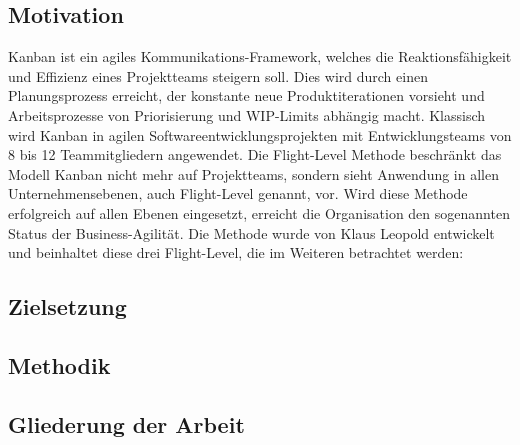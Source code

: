 \subsection{Motivation}
Kanban ist ein agiles Kommunikations-Framework, welches die Reaktionsfähigkeit und Effizienz eines Projektteams steigern soll. Dies wird durch einen Planungsprozess erreicht, der konstante neue Produktiterationen vorsieht und Arbeitsprozesse von Priorisierung und WIP-Limits abhängig macht.
Klassisch wird Kanban in agilen Softwareentwicklungsprojekten mit Entwicklungsteams von 8 bis 12 Teammitgliedern angewendet.
Die Flight-Level Methode beschränkt das Modell Kanban nicht mehr auf Projektteams, sondern sieht Anwendung in allen Unternehmensebenen, auch Flight-Level genannt, vor. Wird diese Methode erfolgreich auf allen Ebenen eingesetzt, erreicht die Organisation den sogenannten Status der Business-Agilität\cite{agilitaetNeuDenken}. 
Die Methode wurde von Klaus Leopold entwickelt und beinhaltet diese drei Flight-Level, die im Weiteren betrachtet werden\cite{agilesProjektmanagementImBerufsalltag}:

\subsection{Zielsetzung}

\subsection{Methodik}

\subsection{Gliederung der Arbeit}
